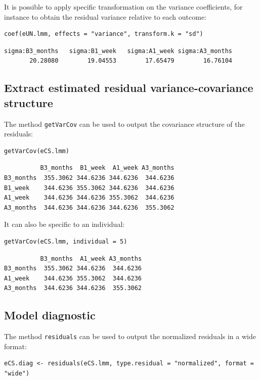 \documentclass[12pt]{article}
\begin{document}
It is possible to apply specific transformation on the variance
coefficients, for instance to obtain the residual variance relative to
each outcome:
\lstset{language=r,label= ,caption= ,captionpos=b,numbers=none}
\begin{lstlisting}
coef(eUN.lmm, effects = "variance", transform.k = "sd")
\end{lstlisting}

\begin{verbatim}
sigma:B3_months   sigma:B1_week   sigma:A1_week sigma:A3_months 
       20.28080        19.04553        17.65479        16.76104
\end{verbatim}

\subsection{Extract estimated residual variance-covariance structure}
\label{sec:org47c66a2}

The method \texttt{getVarCov} can be used to output the covariance structure of the residuals:
\lstset{language=r,label= ,caption= ,captionpos=b,numbers=none}
\begin{lstlisting}
getVarCov(eCS.lmm)
\end{lstlisting}

\begin{verbatim}
          B3_months  B1_week  A1_week A3_months
B3_months  355.3062 344.6236 344.6236  344.6236
B1_week    344.6236 355.3062 344.6236  344.6236
A1_week    344.6236 344.6236 355.3062  344.6236
A3_months  344.6236 344.6236 344.6236  355.3062
\end{verbatim}


It can also be specific to an individual:
\lstset{language=r,label= ,caption= ,captionpos=b,numbers=none}
\begin{lstlisting}
getVarCov(eCS.lmm, individual = 5)
\end{lstlisting}

\begin{verbatim}
          B3_months  A1_week A3_months
B3_months  355.3062 344.6236  344.6236
A1_week    344.6236 355.3062  344.6236
A3_months  344.6236 344.6236  355.3062
\end{verbatim}


\clearpage

\subsection{Model diagnostic}
\label{sec:org375a966}
The method \texttt{residuals} can be used to output the normalized residuals in a wide format:
\lstset{language=r,label= ,caption= ,captionpos=b,numbers=none}
\begin{lstlisting}
eCS.diag <- residuals(eCS.lmm, type.residual = "normalized", format = "wide")
\end{lstlisting}
\end{document}
